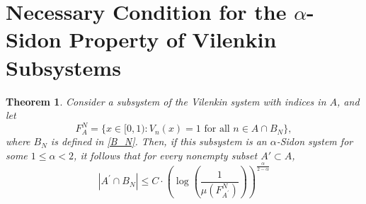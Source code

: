 \documentclass[12pt]{article}
\newtheorem{theorem}{Theorem}  %
\begin{document}
	\section{Necessary Condition for the $\alpha$-Sidon Property of Vilenkin Subsystems} \label{section-6}
	\begin{theorem} \label{theorem-a}
Consider a subsystem of the Vilenkin system with indices in $A$, and let
\[
F_A^N = \bigl\{ x \in [0,1) : V_n(x) = 1 \text{ for all } n \in A \cap B_N \bigr\},
\]
where $B_N$ is defined in \eqref{B_N}. Then, if this subsystem is an $\alpha$-Sidon system for some $1 \le \alpha < 2$, it follows that for every nonempty subset $A' \subset A$,
		\begin{equation} \label{th-a-1}
			|A^{\prime} \cap B_N | \le C \cdot \left(\log\left(\frac{1}{\mu(F_{A^{\prime}}^{N})}\right)\right)^{\frac{\alpha}{2-\alpha}}
		\end{equation}
	\end{theorem}
\end{document}
